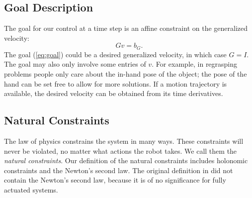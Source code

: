 \subsection{Goal Description} %
\label{sub:goal_description}
The goal for our control at a time step is an affine constraint on the generalized velocity:
\begin{equation}
\label{eq:goal}
	Gv=b_G.
\end{equation}
The goal (\ref{eq:goal}) could be a desired generalized velocity, in which case $G=I$.
The goal may also only involve some entries of $v$. For example, in regrasping problems people only care about the in-hand pose of the object; the pose of the hand can be set free to allow for more solutions.
If a motion trajectory is available, the desired velocity can be obtained from its time derivatives.

\subsection{Natural Constraints} %
\label{sub:natural_constraints}
The law of physics constrains the system in many ways. These constraints will never be violated, no matter what actions the robot takes. We call them the \textit{natural constraints}.  Our definition of the natural constraints includes holonomic constraints and the Newton's second law. The original definition in \cite{mason1981compliance} did not contain the Newton's second law, because it is of no significance for fully actuated systems.
%
